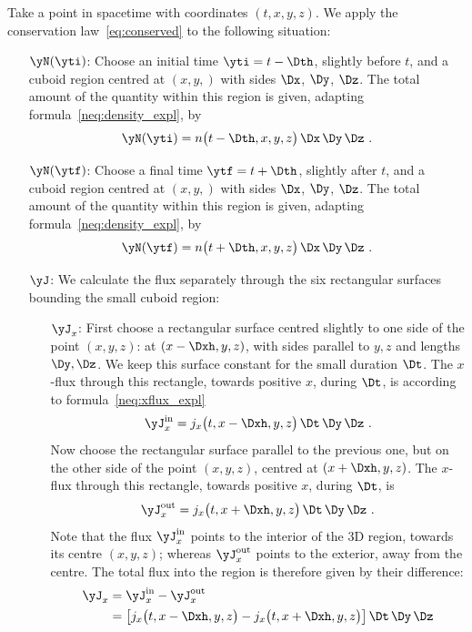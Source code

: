 Take a point in spacetime with coordinates $(t,x,y,z)$. We apply the conservation law~\eqref{eq:conserved} to the following situation:
\begin{itemize}
\item[$\yN(\yti)$:] Choose an initial time $\yti=t-\Dth$, slightly before $t$, and a cuboid region centred at $(x,y,)$ with sides $\Dx$, $\Dy$, $\Dz$. The total amount of the quantity within this region is given, adapting formula~\eqref{neq:density_expl}, by
  \begin{equation}
    \label{neq:C1dens}
    \yN(\yti) = n\bigl(t-\Dth, x,y,z\bigr)\,\Dx\,\Dy\,\Dz \ .
  \end{equation}

\item[$\yN(\ytf)$:] Choose a final time $\ytf = t+\Dth$, slightly after $t$, and a cuboid region centred at $(x,y,)$ with sides $\Dx$, $\Dy$, $\Dz$. The total amount of the quantity within this region is given, adapting formula~\eqref{neq:density_expl}, by
  \begin{equation}
    \label{neq:C2dens}
    \yN(\ytf) = n\bigl(t+\Dth, x,y,z\bigr)\,\Dx\,\Dy\,\Dz \ .
  \end{equation}

\item[$\yJ$:] We calculate the flux separately through the six rectangular surfaces bounding the small cuboid region:
  \begin{itemize}
  \item[$\yJ_{x}$:] First choose a rectangular surface centred slightly to one side of the point $(x,y,z)$: at $(x-\Dxh, y, z)$, with sides parallel to $y,z$ and lengths $\Dy, \Dz$. We keep this surface constant for the small duration $\Dt$. The $x$-flux through this rectangle, towards positive $x$, during $\Dt$, is according to formula~\eqref{neq:xflux_expl}
    \begin{equation*}
      \label{neq:Fxfluxn}
     \yJ_{x}^{\text{in}} = j_{x}\bigl(t, x-\Dxh, y, z\bigr)\,\Dt\,\Dy\,\Dz \ .
    \end{equation*}
    Now choose the rectangular surface parallel to the previous one, but on the other side of the point $(x,y,z)$, centred at $(x+\Dxh, y, z)$. The $x$-flux through this rectangle, towards positive $x$, during $\Dt$, is
    \begin{equation*}
      \label{neq:Fxfluxp}
      \yJ_{x}^{\text{out}} = j_{x}\bigl(t, x+\Dxh, y, z\bigr)\,\Dt\,\Dy\,\Dz \ .
    \end{equation*}
    Note that the flux $\yJ_{x}^{\text{in}}$ points to the interior of the 3D region, towards its centre $(x,y,z)$; whereas $\yJ_{x}^{\text{out}}$ points to the exterior, away from the centre. The total flux into the region is therefore given by their difference:
    \begin{equation}
      \label{neq:Fxflux}
      \begin{split}
        \yJ_{x} &= \yJ_{x}^{\text{in}} - \yJ_{x}^{\text{out}}
        \\&= \bigl[ j_{x}\bigl(t, x-\Dxh, y, z\bigr) - j_{x}\bigl(t, x+\Dxh, y, z\bigr)\bigr]
        \,\Dt\,\Dy\,\Dz
      \end{split}
    \end{equation}


\end{itemize}
\end{itemize}
